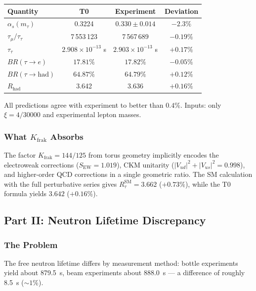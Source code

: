 	\begin{center}
		\small
		\begin{tabular}{lccc}
			\textbf{Quantity} & \textbf{T0} & \textbf{Experiment} & \textbf{Deviation} \\
			\hline
			\(\alpha_s(m_\tau)\) & 0.3224 & \(0.330 \pm 0.014\) & \(-2.3\%\) \\
			\(\tau_\mu/\tau_\tau\) & 7\,553\,123 & 7\,567\,689 & \(-0.19\%\) \\
			\(\tau_\tau\) & \(2.908 \times 10^{-13}\) s & \(2.903 \times 10^{-13}\) s & \(+0.17\%\) \\
			\(BR(\tau \to e)\) & \(17.81\%\) & \(17.82\%\) & \(-0.05\%\) \\
			\(BR(\tau \to \text{had})\) & \(64.87\%\) & \(64.79\%\) & \(+0.12\%\) \\
			\(R_\text{had}\) & 3.642 & 3.636 & \(+0.16\%\) \\
		\end{tabular}
	\end{center}
	
	All predictions agree with experiment to better than \(0.4\%\). Inputs: only \(\xi = 4/30000\) and experimental lepton masses.
	
	\subsubsection*{What \(K_\text{frak}\) Absorbs}
	
	The factor \(K_\text{frak} = 144/125\) from torus geometry implicitly encodes the electroweak corrections (\(S_\text{EW} = 1.019\)), CKM unitarity (\(|V_{ud}|^2 + |V_{us}|^2 = 0.998\)), and higher-order QCD corrections in a single geometric ratio. The SM calculation with the full perturbative series gives \(R_\tau^\text{SM} = 3.662\) (\(+0.73\%\)), while the T0 formula yields \(3.642\) (\(+0.16\%\)).
	
	
	\subsection*{Part II: Neutron Lifetime Discrepancy}
	
	\subsubsection*{The Problem}
	
	The free neutron lifetime differs by measurement method: bottle experiments yield about \SI{879.5}{\second}, beam experiments about \SI{888.0}{\second} — a difference of roughly \SI{8.5}{\second} (\(\sim 1\%\)).
	
